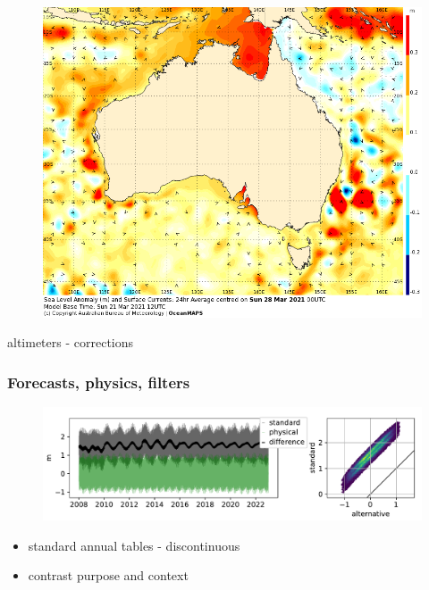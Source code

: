 \begin{frame}
\begin{minipage}{0.45\textwidth}
    \begin{figure}      
     \includegraphics[width=\textwidth]{figures/images/IDYOC300.Aus.SLACur.168.png}
    \end{figure}
    altimeters - corrections
\end{minipage}


\end{frame}
\begin{frame}
\frametitle{Forecasts, physics, filters}

      \begin{figure}      
        \includegraphics[width=\textwidth]{figures/plots/piecewiseTide_62430.pdf}
      \end{figure}

      \begin{itemize}
          \item standard annual tables - discontinuous
          \item contrast purpose and context
      \end{itemize}

\end{frame}

